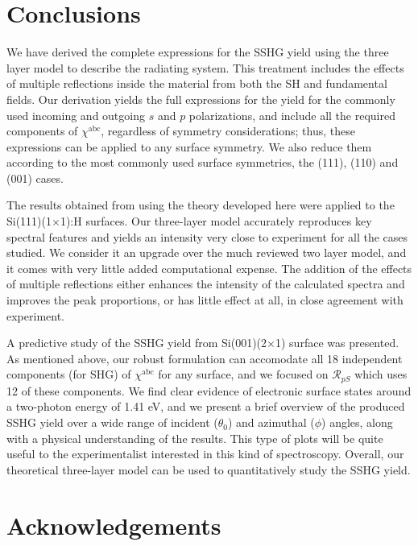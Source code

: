 \documentclass[aps,prb,10pt,showpacs,letterpaper,twocolumn]{revtex4-1}
\begin{document}
\section{Conclusions}\label{sec:conclusions}

We have derived the complete expressions for the SSHG yield using the three
layer model to describe the radiating system. This treatment includes the
effects of multiple reflections inside the material from both the SH and
fundamental fields. Our derivation yields the full expressions for the yield for
the commonly used incoming and outgoing $s$ and $p$ polarizations, and include
all the required components of $\chi^{\mathrm{abc}}$, regardless of symmetry
considerations; thus, these expressions can be applied to any surface symmetry.
We also reduce them according to the most commonly used surface symmetries, the
(111), (110) and (001) cases.

The results obtained from using the theory developed here were applied to the
Si(111)(1$\times$1):H surfaces. Our three-layer model accurately reproduces key
spectral features and yields an intensity very close to experiment for all the
cases studied. We consider it an upgrade over the much reviewed two layer
model,\cite{mizrahiJOSA88} and it comes with very little added computational
expense. The addition of the effects of multiple reflections either enhances the
intensity of the calculated spectra and improves the peak proportions, or has
little effect at all, in close agreement with experiment.

A predictive study of the SSHG yield from Si(001)(2$\times$1) surface was
presented. As mentioned above, our robust formulation can accomodate all 18
independent components (for SHG) of $\chi^{\mathrm{abc}}$ for any surface, and
we focused on $\mathcal{R}_{pS}$ which uses 12 of these components. We find
clear evidence of electronic surface states around a two-photon energy of 1.41
eV, and we present a brief overview of the produced SSHG yield over a wide range
of incident ($\theta_{0}$) and azimuthal ($\phi$) angles, along with a physical
understanding of the results. This type of plots will be quite useful to the
experimentalist interested in this kind of spectroscopy. Overall, our
theoretical three-layer model can be used to quantitatively study the SSHG
yield.


\section{Acknowledgements}\label{sec:acknowledgements}
\end{document}
